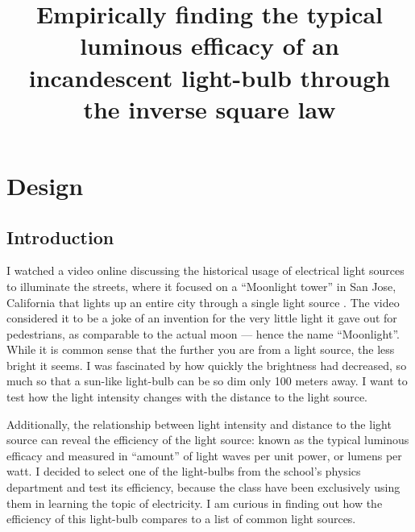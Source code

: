 \documentclass[a4paper,12pt]{article}
\title{Empirically finding the typical luminous efficacy of an incandescent light-bulb through the inverse square law}
\author{}
\date{\vspace{-8ex}}
\begin{document}
\maketitle

\section{Design}

\subsection{Introduction}
I watched a video online discussing the historical usage of electrical light sources to illuminate the streets, where it focused on a ``Moonlight tower'' in San Jose, California that lights up an entire city through a single light source \parencite{tower}. The video considered it to be a joke of an invention for the very little light it gave out for pedestrians, as comparable to the actual moon --- hence the name ``Moonlight''. While it is common sense that the further you are from a light source, the less bright it seems. I was fascinated by how quickly the brightness had decreased, so much so that a sun-like light-bulb can be so dim only 100 meters away. I want to test how the light intensity changes with the distance to the light source.

Additionally, the relationship between light intensity and distance to the light source can reveal the efficiency of the light source: known as the typical luminous efficacy and measured in ``amount'' of light waves per unit power, or lumens per watt. I decided to select one of the light-bulbs from the school's physics department and test its efficiency, because the class have been exclusively using them in learning the topic of electricity. I am curious in finding out how the efficiency of this light-bulb compares to a list of common light sources.

\end{document}
